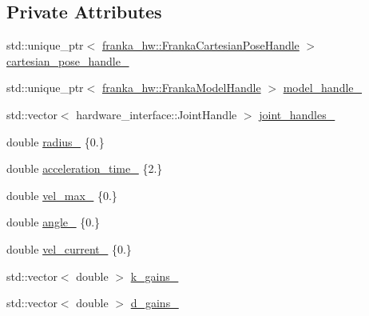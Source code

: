 \subsection*{Private Attributes}
\begin{DoxyCompactItemize}
\item 
std\+::unique\+\_\+ptr$<$ \hyperlink{classfranka__hw_1_1FrankaCartesianPoseHandle}{franka\+\_\+hw\+::\+Franka\+Cartesian\+Pose\+Handle} $>$ \hyperlink{classfranka__example__controllers_1_1JointImpedanceExampleController_ade68e268a35c4b1a52c0dc4c811a074f}{cartesian\+\_\+pose\+\_\+handle\+\_\+}
\item 
std\+::unique\+\_\+ptr$<$ \hyperlink{classfranka__hw_1_1FrankaModelHandle}{franka\+\_\+hw\+::\+Franka\+Model\+Handle} $>$ \hyperlink{classfranka__example__controllers_1_1JointImpedanceExampleController_a2ed243b27c3639ddeb284d7acdf76d8a}{model\+\_\+handle\+\_\+}
\item 
std\+::vector$<$ hardware\+\_\+interface\+::\+Joint\+Handle $>$ \hyperlink{classfranka__example__controllers_1_1JointImpedanceExampleController_a64340fe9c37cfbdacac36129ef8f1504}{joint\+\_\+handles\+\_\+}
\item 
double \hyperlink{classfranka__example__controllers_1_1JointImpedanceExampleController_ae312280e14358c15d9fc3398e149a6dc}{radius\+\_\+} \{0.\}
\item 
double \hyperlink{classfranka__example__controllers_1_1JointImpedanceExampleController_aed26e5a5b23daaaacbd810caad1e2343}{acceleration\+\_\+time\+\_\+} \{2.\}
\item 
double \hyperlink{classfranka__example__controllers_1_1JointImpedanceExampleController_a6a988f0c94bef853f6771068a49f66c2}{vel\+\_\+max\+\_\+} \{0.\}
\item 
double \hyperlink{classfranka__example__controllers_1_1JointImpedanceExampleController_abdec90430c89c3d3d7c8a17dff886c48}{angle\+\_\+} \{0.\}
\item 
double \hyperlink{classfranka__example__controllers_1_1JointImpedanceExampleController_af0c7f07dd97fcc67b15c3a520086827a}{vel\+\_\+current\+\_\+} \{0.\}
\item 
std\+::vector$<$ double $>$ \hyperlink{classfranka__example__controllers_1_1JointImpedanceExampleController_a489d73033258b6f34dfbe8b3fc101b51}{k\+\_\+gains\+\_\+}
\item 
std\+::vector$<$ double $>$ \hyperlink{classfranka__example__controllers_1_1JointImpedanceExampleController_ab19eea8c0c0d0da745294e15211f4593}{d\+\_\+gains\+\_\+}
\item 

\end{DoxyCompactItemize}

